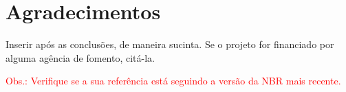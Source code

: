 \documentclass[a4paper,11pt]{article} %
\begin{document}



\section*{Agradecimentos}

Inserir após as conclusões, de maneira sucinta. Se o projeto for financiado por alguma agência de fomento, citá-la.



{\textcolor {red}{Obs.: Verifique se a sua referência está seguindo a versão da NBR mais recente.}}
\end{document}
